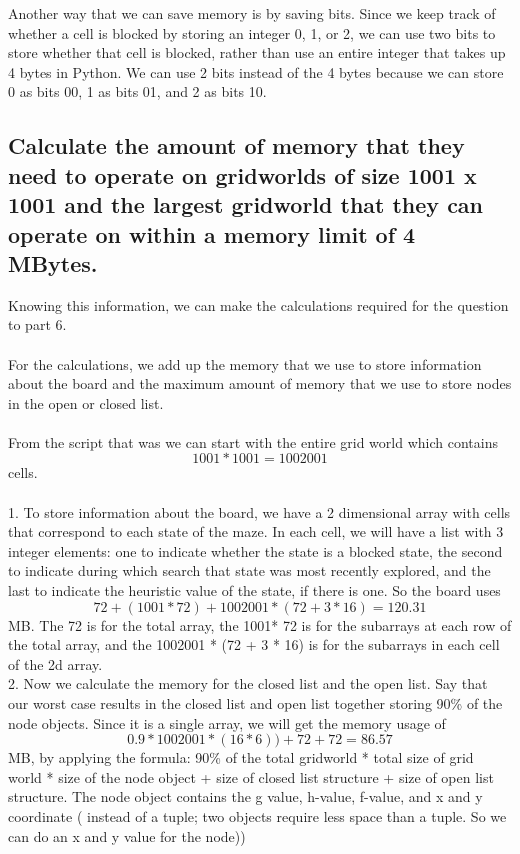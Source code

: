 \documentclass{article}
\begin{document}
Another way that we can save memory is by saving bits. Since we keep track of whether a cell is blocked by storing an integer 0, 1, or 2, we can use two bits to store whether that cell is blocked, rather than use an entire integer that takes up 4 bytes in Python. We can use 2 bits instead of the 4 bytes because we can store 0 as bits 00, 1 as bits 01, and 2 as bits 10. 


\subsection{Calculate the amount of memory that they need to operate on gridworlds of size 1001 x 1001 and the largest gridworld that they can operate on within a memory limit of 4 MBytes.}

Knowing this information, we can make the calculations required for the question to part 6.\\\\
For the calculations, we add up the memory that we use to store information about the board and the maximum amount of memory that we use to store nodes in the open or closed list.\\\\
From the script that was we can start with the entire grid world which contains\\
\[ 1001 * 1001 = 1002001 \] 
cells. \\\\
1. To store information about the board, we have a 2 dimensional array with cells that correspond to each state of the maze. In each cell, we will have a list with 3 integer elements: one to indicate whether the state is a blocked state, the second to indicate during which search that state was most recently explored, and the last to indicate the heuristic value of the state, if there is one. So the board uses
\[72 + (1001 * 72) + 1002001 * (72 + 3 * 16) = 120.31\]
MB. The 72 is for the total array, the 1001* 72 is for the subarrays at each row of the total array, and the 1002001 * (72 + 3 * 16)  is for the subarrays in each cell of the 2d array. \\

2. Now we calculate the memory for the closed list and the open list. Say that our worst case results in the closed list and open list together storing 90\% of the node objects. Since it is a single array, we will get the memory usage of 
\[0.9 * 1002001 * (16 * 6)) + 72 +72 = 86.57 \]
MB, by applying the formula: 90\% of the total gridworld * total size of grid world * size of the node object + size of closed list structure + size of open list structure. The node object contains the g value, h-value, f-value, and x and y coordinate ( instead of a tuple; two objects require less space than a tuple. So we can do an x and y value for the node))\\
\end{document}
